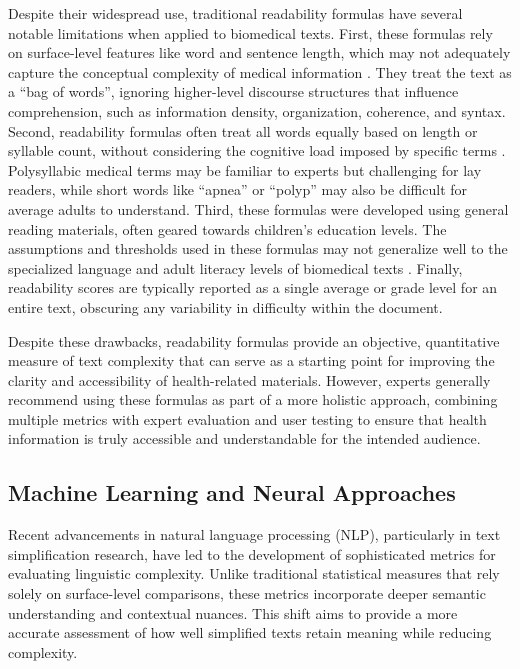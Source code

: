 Despite their widespread use, traditional readability formulas have several notable limitations when applied to biomedical texts.
First, these formulas rely on surface-level features like word and sentence length, which may not adequately capture the conceptual complexity of medical information \cite{Crossley2022, WANG2013503, Singh2024}.
They treat the text as a ``bag of words'', ignoring higher-level discourse structures that influence comprehension, such as information density, organization, coherence, and syntax. 
Second, readability formulas often treat all words equally based on length or syllable count, without considering the cognitive load imposed by specific terms \cite{Swanson2024}.
Polysyllabic medical terms may be familiar to experts but challenging for lay readers, while short words like ``apnea'' or ``polyp'' may also be difficult for average adults to understand. 
Third, these formulas were developed using general reading materials, often geared towards children's education levels. The assumptions and thresholds used in these formulas may not generalize well to the specialized language and adult literacy levels of biomedical texts \cite{Crossley2022}.
Finally, readability scores are typically reported as a single average or grade level for an entire text, obscuring any variability in difficulty within the document.

Despite these drawbacks, readability formulas provide an objective, quantitative measure of text complexity that can serve as a starting point for improving the clarity and accessibility of health-related materials. However, experts generally recommend using these formulas as part of a more holistic approach, combining multiple metrics with expert evaluation and user testing to ensure that health information is truly accessible and understandable for the intended audience.

\subsection{Machine Learning and Neural Approaches}

Recent advancements in natural language processing (NLP), particularly in text simplification research, have led to the development of sophisticated metrics for evaluating linguistic complexity. Unlike traditional statistical measures that rely solely on surface-level comparisons, these metrics incorporate deeper semantic understanding and contextual nuances. This shift aims to provide a more accurate assessment of how well simplified texts retain meaning while reducing complexity.

